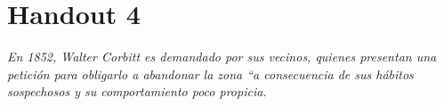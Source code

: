 \chapter{Handout 4}

\emph{En 1852, Walter Corbitt es demandado por sus vecinos, quienes presentan
una petición para obligarlo a abandonar la zona “a consecuencia de sus hábitos
sospechosos y su comportamiento poco propicia.}


